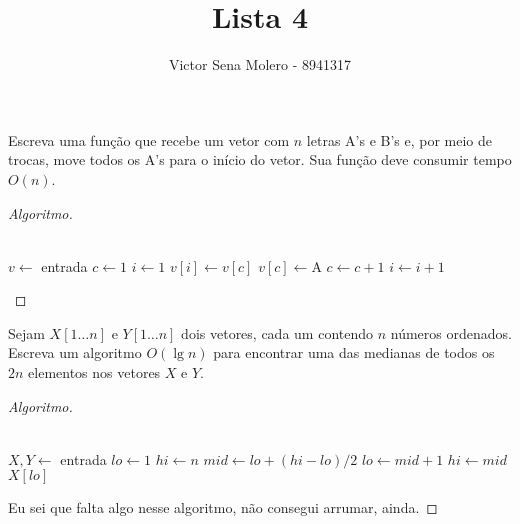 \documentclass[12pt]{article}
\newenvironment{problem}[2][Ex]{\begin{trivlist}
\item[\hskip \labelsep {\bfseries #1}\hskip \labelsep {\bfseries #2.}]}{\end{trivlist}}
\begin{document}
 
 
\title{Lista 4}
\author{Victor Sena Molero - 8941317}
\maketitle
 
\begin{problem}{1}
Escreva uma função que recebe um vetor com $n$ letras A's e B's e, por meio de trocas, move todos os A's para o início do vetor. Sua função deve consumir tempo $O(n)$. 
\end{problem}
 
\begin{proof}[Algoritmo]
\begin{algorithmic}
\\
\State $v \gets$ entrada
\State $c \gets 1$
\State $i \gets 1$ 
        \State $v[i] \gets v[c]$
        \State $v[c] \gets \text{A}$
        \State $c \gets c+1$
    \EndIf
    \State $i \gets i+1$
\EndWhile
\end{algorithmic}
\end{proof}

\begin{problem}{3}
Sejam $X[1\dots n]$ e $Y[1\dots n]$ dois vetores, cada um contendo $n$ números ordenados. Escreva um algoritmo $O(\lg n)$ para encontrar uma das medianas de todos os $2n$ elementos nos vetores $X$ e $Y$. 
\end{problem}

\begin{proof}[Algoritmo]
\begin{algorithmic}
\\
\State $X,Y \gets$ entrada
\State $lo \gets 1$
\State $hi \gets n$
    \State $mid \gets lo+(hi-lo)/2$
        \State $lo \gets mid+1$
    \Else
        \State $hi \gets mid$
    \EndIf
\EndWhile
\State \Return $X[lo]$

\end{algorithmic}
Eu sei que falta algo nesse algoritmo, não consegui arrumar, ainda.
\end{proof}
\end{document}
